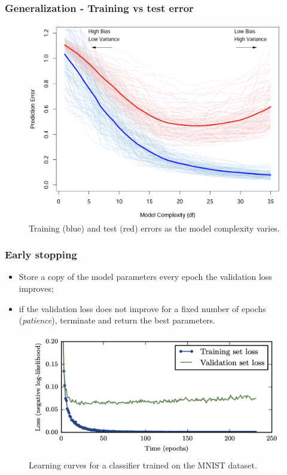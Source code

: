\documentclass{beamer}
\begin{document}
	\begin{frame}
	\frametitle{Generalization - Training vs test error}
	\begin{figure}
		\centering
		\includegraphics[scale=0.8]{images/model_selection_general_idea}
		\caption{Training (blue) and test (red) errors as the model complexity varies.}
	\end{figure}
\end{frame}

	\begin{frame}
	\frametitle{Early stopping}
	\begin{itemize}
		\item Store a copy of the model parameters every epoch the validation loss improves;
		\item if the validation loss does not improve for a fixed number of epochs (\textit{patience}), terminate and return the best parameters.
	\end{itemize}
	\begin{figure}
		\centering
		\includegraphics[scale=0.45]{images/early_stopping}
		\caption{Learning curves for a classifier trained on the MNIST dataset.}
	\end{figure}
\end{frame}
\end{document}
